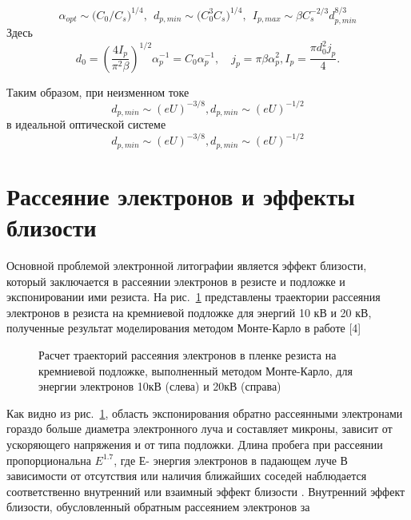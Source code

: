 \begin{equation}
\alpha_{opt}\sim{(}C_0/C_s{)}^{1/4},\>\>d_{p,min}\sim{(}C_0^3 C_s{)}^{1/4},\>\> I_{p,max}\sim \beta C_s^{-2/3} d_{p,min}^{8/3}\label{eq:A6}
\end{equation}
Здесь
\[
    d_0= \left(\frac{4I_p}{\pi^2 \beta}\right)^{1/2} \alpha_p^{-1}=C_0\alpha_p^{-1},
    \quad j_p=\pi \beta \alpha_p^2 , I_p= \frac{\pi d_0^2 j_p}{4}.
\]

Таким образом, при неизменном токе
\begin{equation}
d_{p,min}\sim (eU)^{-3/8},d_{p,min}\sim(eU)^{-1/2}
\label{eq:A7}
\end{equation}
в идеальной оптической системе
\begin{equation}
d_{p,min}\sim (eU)^{-3/8},d_{p,min}\sim(eU)^{-1/2}
\end{equation}

\section{Рассеяние электронов и эффекты близости}

Основной проблемой электронной литографии является эффект близости, который заключается в рассеянии электронов в резисте и подложке и экспонировании ими резиста. На рис.~\ref{fig:4} представлены траектории рассеяния электронов в резиста на кремниевой подложке для энергий 10 кВ и 20 кВ, полученные результат моделирования методом Монте-Карло в работе [4]

\begin{figure}[H]
\center
\caption{ Расчет траекторий рассеяния электронов в пленке резиста на кремниевой подложке, выполненный методом Монте-Карло, для энергии электронов 10кВ (слева) и 20кВ (справа)}
\label{fig:4}
\end{figure}

Как видно из рис.~\ref{fig:4}, область экспонирования обратно рассеянными электронами гораздо больше диаметра электронного луча и составляет микроны, зависит от ускоряющего напряжения и от типа подложки. Длина пробега при рассеянии пропорциональна $E^{1.7}$, где Е- энергия электронов в падающем луче
В зависимости от отсутствия или наличия ближайших соседей наблюдается соответственно внутренний или взаимный эффект близости . Внутренний эффект близости, обусловленный обратным рассеянием электронов за

